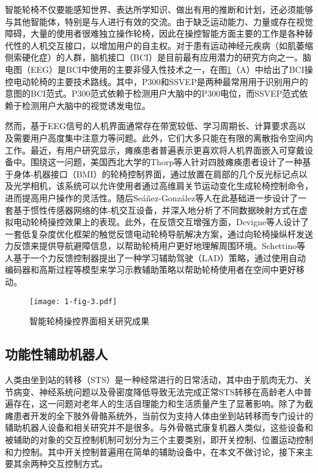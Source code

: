 智能轮椅不仅要能感知世界、表达所学知识、做出有用的推断和计划，还必须能够与其他智能体，特别是与人进行有效的交流。由于缺乏运动能力、力量或存在视觉障碍，大量的使用者很难独立操作轮椅\cite{hartmanHumanMachineInterfaceSmart2019}，因此在操控智能方面主要的工作是各种替代性的人机交互接口，以增加用户的自主权。对于患有运动神经元疾病（如肌萎缩侧索硬化症）的人群，脑机接口（BCI）是目前最有应用潜力的研究方向之一。脑电图（EEG）是BCI中使用的主要非侵入性技术之一，在图\ref{fig:1-3}（A）中给出了BCI操控电动轮椅的主要技术路线\cite{naserPracticalBCIDrivenWheelchairs2023}。其中，P300和SSVEP是两种最常用用于识别用户的意图的BCI范式。P300范式依赖于检测用户大脑中的P300电位\cite{rebsamenBrainControlledWheelchair2010}，而SSVEP范式依赖于检测用户大脑中的视觉诱发电位\cite{dongMultimodalBrainComputer2022a,ngIndirectControlAutonomous2020,mistrySSVEPBasedBrain2018}。

然而，基于EEG信号的人机界面通常存在带宽较低、学习周期长、计算要求高以及需要用户高度集中注意力等问题。此外，它们大多只能在有限的离散指令空间内工作。最近，有用户研究显示，瘫痪患者普遍表示更喜欢将人机界面嵌入可穿戴设备中\cite{zhangUnderstandingInteractionsSmart2022}。围绕这一问题，美国西北大学的Thorp等人\cite{thorpUpperBodyBasedPower2016d}针对四肢瘫痪患者设计了一种基于身体-机器接口（BMI）的轮椅控制界面，通过放置在肩部的几个反光标记点以及光学相机，该系统可以允许使用者通过高维肩关节运动变化生成轮椅控制命令，进而提高用户操作的灵活性。随后Seáñez-González等人\cite{seanez-gonzalezStaticDynamicDecoding2017}在此基础进一步设计了一套基于惯性传感器网络的体-机交互设备，并深入地分析了不同数据映射方式在虚拟电动轮椅操控效果上的表现。此外，在反馈交互增强方面，Devigne等人\cite{devigneDesignHapticGuidance2018}设计了一套低复杂度优化框架的触觉反馈电动轮椅导航解决方案，通过向轮椅操纵杆发送力反馈来提供导航避障信息，以帮助轮椅用户更好地理解周围环境。Schettino等人\cite{schettinoImprovingGeneralisationLearning2020}基于一个力反馈控制器提出了一种学习辅助驾驶（LAD）策略，通过使用自动编码器和高斯过程等模型来学习示教辅助策略以帮助轮椅使用者在空间中更好移动。

\begin{figure}[h]
  \centering
  \texttt{[image: 1-fig-3.pdf]}
  \caption{智能轮椅操控界面相关研究成果}
  \label{fig:1-3}
\end{figure}

\subsection{功能性辅助机器人}
人类由坐到站的转移（STS）是一种经常进行的日常活动，其中由于肌肉无力、关节病变、神经系统问题以及骨密度降低导致无法完成正常STS转移在高龄老人中普遍存在，这一问题对老年人的生活自理能力和生活质量产生了显著影响。除了为截瘫患者开发的全下肢外骨骼系统外，当前仅为支持人体由坐到站转移而专门设计的辅助机器人设备和相关研究并不是很多。与外骨骼式康复机器人类似，这些设备和被辅助的对象的交互控制机制可划分为三个主要类别，即开关控制、位置运动控制和力控制。其中开关控制普遍用在简单的辅助设备中，在本文不做讨论，接下来主要其余两种交互控制方式。

